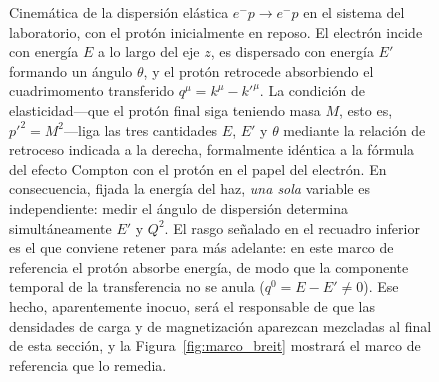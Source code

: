 \documentclass[10pt,a4paper]{article}
\begin{document}
\begin{figure}[t]
\begin{tikzpicture}[>=stealth, line width=0.7pt, font=\small]
\end{tikzpicture}
\caption{Cinemática de la dispersión elástica $e^- p \to e^- p$ en el sistema del laboratorio, con el protón inicialmente en reposo. El electrón incide con energía $E$ a lo largo del eje $z$, es dispersado con energía $E'$ formando un ángulo $\theta$, y el protón retrocede absorbiendo el cuadrimomento transferido $q^\mu = k^\mu - k'^\mu$. La condición de elasticidad---que el protón final siga teniendo masa $M$, esto es, $p'^2 = M^2$---liga las tres cantidades $E$, $E'$ y $\theta$ mediante la relación de retroceso indicada a la derecha, formalmente idéntica a la fórmula del efecto Compton con el protón en el papel del electrón. En consecuencia, fijada la energía del haz, \emph{una sola} variable es independiente: medir el ángulo de dispersión determina simultáneamente $E'$ y $Q^2$. El rasgo señalado en el recuadro inferior es el que conviene retener para más adelante: en este marco de referencia el protón absorbe energía, de modo que la componente temporal de la transferencia no se anula ($q^0 = E - E' \neq 0$). Ese hecho, aparentemente inocuo, será el responsable de que las densidades de carga y de magnetización aparezcan mezcladas al final de esta sección, y la Figura~\ref{fig:marco_breit} mostrará el marco de referencia que lo remedia.}
\label{fig:cinematica_lab}
\end{figure}
\end{document}
